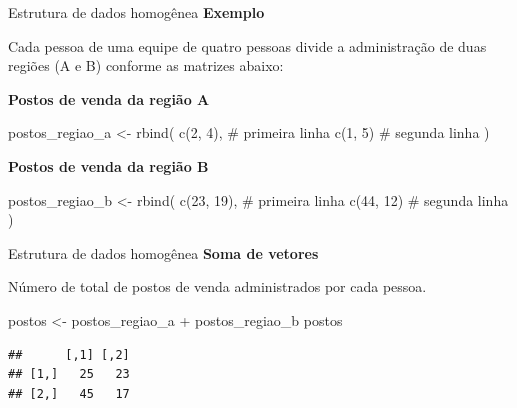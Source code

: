 \documentclass[
  10pt,
  ignorenonframetext,
]{beamer}
\newenvironment{Shaded}{}{}
\newcommand{\CommentTok}[1]{\textcolor[rgb]{0.00,0.50,0.00}{#1}}
\newcommand{\DecValTok}[1]{#1}
\newcommand{\KeywordTok}[1]{\textcolor[rgb]{0.00,0.00,1.00}{#1}}
\newcommand{\NormalTok}[1]{#1}
\newcommand{\OperatorTok}[1]{#1}
\newcommand{\StringTok}[1]{\textcolor[rgb]{0.00,0.50,0.50}{#1}}
\begin{document}
\begin{frame}[fragile]{Estrutura de dados homogênea}
\protect\hypertarget{estrutura-de-dados-homoguxeanea-12}{}
\textbf{Exemplo}

Cada pessoa de uma equipe de quatro pessoas divide a administração de
duas regiões (A e B) conforme as matrizes abaixo:

\textbf{Postos de venda da região A}

\begin{Shaded}
\begin{Highlighting}[]
\NormalTok{postos\_regiao\_a \textless{}{-}}\StringTok{ }\KeywordTok{rbind}\NormalTok{(}
  \KeywordTok{c}\NormalTok{(}\DecValTok{2}\NormalTok{, }\DecValTok{4}\NormalTok{), }\CommentTok{\# primeira linha}
  \KeywordTok{c}\NormalTok{(}\DecValTok{1}\NormalTok{, }\DecValTok{5}\NormalTok{) }\CommentTok{\# segunda linha}
\NormalTok{)}
\end{Highlighting}
\end{Shaded}

\textbf{Postos de venda da região B}

\begin{Shaded}
\begin{Highlighting}[]
\NormalTok{postos\_regiao\_b \textless{}{-}}\StringTok{ }\KeywordTok{rbind}\NormalTok{(}
  \KeywordTok{c}\NormalTok{(}\DecValTok{23}\NormalTok{, }\DecValTok{19}\NormalTok{), }\CommentTok{\# primeira linha}
  \KeywordTok{c}\NormalTok{(}\DecValTok{44}\NormalTok{, }\DecValTok{12}\NormalTok{) }\CommentTok{\# segunda linha}
\NormalTok{)}
\end{Highlighting}
\end{Shaded}
\end{frame}

\begin{frame}[fragile]{Estrutura de dados homogênea}
\protect\hypertarget{estrutura-de-dados-homoguxeanea-13}{}
\textbf{Soma de vetores}

Número de total de postos de venda administrados por cada pessoa.

\begin{Shaded}
\begin{Highlighting}[]
\NormalTok{postos \textless{}{-}}\StringTok{ }\NormalTok{postos\_regiao\_a }\OperatorTok{+}\StringTok{ }\NormalTok{postos\_regiao\_b}
\NormalTok{postos}
\end{Highlighting}
\end{Shaded}

\begin{verbatim}
##      [,1] [,2]
## [1,]   25   23
## [2,]   45   17
\end{verbatim}
\end{frame}
\end{document}
